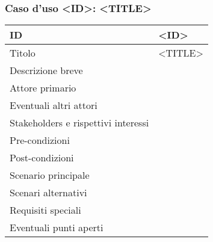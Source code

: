 \documentclass[../../main.tex]{subfiles}
\begin{document}
\subsubsection{Caso d’uso <ID>: <TITLE>}
\begin{tabularx}{150mm}{|l|X|}
    \hline
    ID                                  & \textbf{<ID>}\\
    \hline
    Titolo                              & <TITLE>\\
    \hline
    Descrizione breve                   &    \\
    \hline
    Attore primario                     &    \\
    \hline
    Eventuali altri attori              &    \\
    \hline
    Stakeholders e rispettivi interessi &    \\
    \hline
    Pre-condizioni                      &    \\
    \hline
    Post-condizioni                     &    \\
    \hline
    Scenario principale                 &    \\
    \hline
    Scenari alternativi                 &    \\
    \hline
    Requisiti speciali                  &    \\
    \hline
    Eventuali punti aperti              &    \\
    \hline
\end{tabularx}
\newpage
\end{document}
